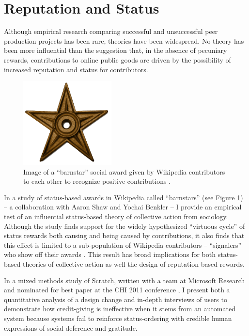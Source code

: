 \documentclass[10pt]{memoir}
\begin{document}
\section{Reputation and Status}

Although empirical research comparing successful and unsuccessful peer
production projects has been rare, theories have been widespread. No
theory has been more influential than the suggestion that, in the
absence of pecuniary rewards, contributions to online public goods are
driven by the possibility of increased reputation and status for
contributors.

\begin{figure}
 \vspace{-1em}
 \begin{centering}
 \includegraphics[width=1.9in]{figures/barnstar_alone.png}
 \caption{Image of a ``barnstar'' social award given by Wikipedia
   contributors to each other to recognize positive contributions .}
 \label{fig:barnstar}
 \end{centering}
 \vspace{-1em}
\end{figure}

In a study of status-based awards in Wikipedia called ``barnstars''
(see Figure \ref{fig:barnstar}) -- a collaboration with Aaron Shaw and
Yochai Benkler -- I provide an empirical test of an influential
status-based theory of collective action from sociology. Although the
study finds support for the widely hypothesized ``virtuous cycle'' of
status rewards both causing and being caused by contributions, it also
finds that this effect is limited to a sub-population of Wikipedia
contributors -- ``signalers'' who show off their awards
\cite{hill_status_2012}. This result has broad implications for both
status-based theories of collective action as well the design of
reputation-based rewards.

In a mixed methods study of Scratch, written with a team at Microsoft
Research and nominated for best paper at the CHI 2011 conference
\cite{monroy-hernandez_computers_2011}, I present both a quantitative
analysis of a design change and in-depth interviews of users to
demonstrate how credit-giving is ineffective when it stems from an
automated system because systems fail to reinforce status-ordering
with credible human expressions of social deference and gratitude.
\end{document}
